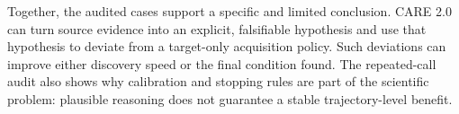 Together, the audited cases support a specific and limited conclusion. CARE
2.0 can turn source evidence into an explicit, falsifiable hypothesis and use
that hypothesis to deviate from a target-only acquisition policy. Such
deviations can improve either discovery speed or the final condition found.
The repeated-call audit also shows why calibration and stopping rules are part
of the scientific problem: plausible reasoning does not guarantee a stable
trajectory-level benefit.

